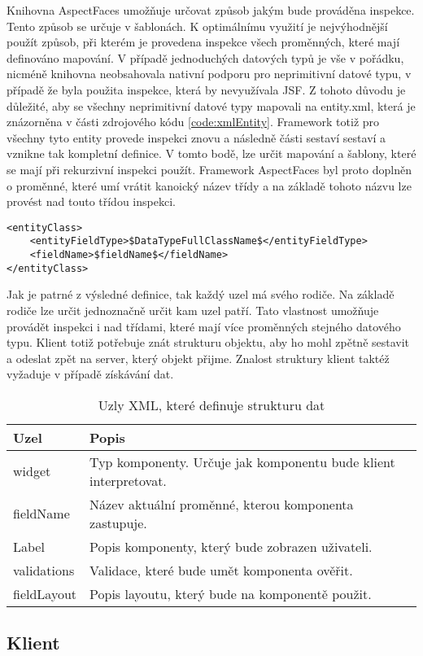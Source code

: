 Knihovna AspectFaces umožňuje určovat způsob jakým bude prováděna inspekce. Tento způsob se určuje v šablonách. K optimálnímu využití je nejvýhodnější použít způsob, při kterém je provedena inspekce všech proměnných, které mají definováno mapování. V případě jednoduchých datových typů je vše v pořádku, nicméně knihovna neobsahovala nativní podporu pro neprimitivní datové typu, v případě že byla použita inspekce, která by nevyužívala JSF. Z tohoto důvodu je důležité, aby se všechny neprimitivní datové typy mapovali na entity.xml, která je znázorněna v části zdrojového kódu \ref{code:xmlEntity}. Framework totiž pro všechny tyto entity provede inspekci znovu a následně části sestaví sestaví a vznikne tak kompletní definice. V tomto bodě, lze určit mapování a šablony, které se mají při rekurzivní inspekci použít. Framework AspectFaces byl proto doplněn o proměnné, které umí vrátit kanoický název třídy a na základě tohoto názvu lze provést nad touto třídou inspekci. 
\begin{lstlisting}[caption=Ukázka definice neprimitvního datového typu,
  label={code:xmlEntity}]
<entityClass>
	<entityFieldType>$DataTypeFullClassName$</entityFieldType>
	<fieldName>$fieldName$</fieldName>
</entityClass>
\end{lstlisting}

Jak je patrné z výsledné definice, tak každý uzel má svého rodiče. Na základě rodiče lze určit jednoznačně určit kam uzel patří. Tato vlastnost umožňuje provádět inspekci i nad třídami, které mají více proměnných stejného datového typu. Klient totiž potřebuje znát strukturu objektu, aby ho mohl zpětně sestavit a odeslat zpět na server, který objekt přijme. Znalost struktury klient taktéž vyžaduje v případě získávání dat.

\begin{table}[width=\linewidth]
\begin{center}
\caption{Uzly XML, které definuje strukturu dat}
\label{table:xmlComponentAttributes}
\begin{tabular}{|p{7cm}|p{7cm}|}
\hline
\textbf{Uzel} & \textbf{Popis} \\
\hline
widget & 
Typ komponenty. Určuje jak komponentu bude klient interpretovat.\\
\hline
fieldName &
Název aktuální proměnné, kterou komponenta zastupuje.\\
\hline
Label &
Popis komponenty, který bude zobrazen uživateli. \\
\hline
validations &
Validace, které bude umět komponenta ověřit. \\
\hline
fieldLayout&
Popis layoutu, který bude na komponentě použit. \\
\hline
\end{tabular}
\end{center}
\end{table}


\subsection{Klient}

